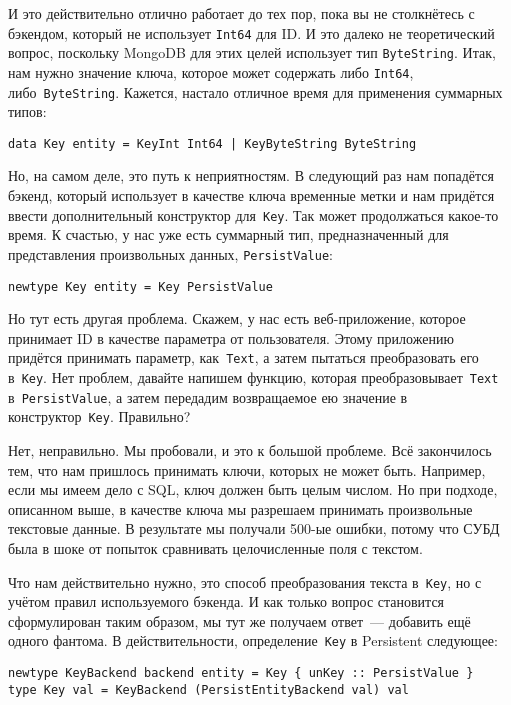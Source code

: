 И это действительно отлично работает до тех пор, пока вы не столкнётесь с
бэкендом, который не использует \lstinline'Int64' для ID. И это далеко не
теоретический вопрос, поскольку MongoDB для этих целей использует тип
\lstinline'ByteString'. Итак, нам нужно значение ключа, которое может содержать
либо \lstinline'Int64', либо~\lstinline'ByteString'. Кажется, настало отличное
время для применения суммарных типов:

\begin{lstlisting}
data Key entity = KeyInt Int64 | KeyByteString ByteString
\end{lstlisting}

Но, на самом деле, это путь к неприятностям. В следующий раз нам попадётся
бэкенд, который использует в качестве ключа временные метки и нам придётся
ввести дополнительный конструктор для~\lstinline'Key'. Так может продолжаться
какое-то время. К счастью, у нас уже есть суммарный тип, предназначенный для
представления произвольных данных, \lstinline'PersistValue':

\begin{lstlisting}
newtype Key entity = Key PersistValue
\end{lstlisting}

Но тут есть другая проблема. Скажем, у нас есть веб-приложение, которое
принимает ID в качестве параметра от пользователя. Этому приложению придётся
принимать параметр, как~\lstinline'Text', а затем пытаться преобразовать его
в~\lstinline'Key'. Нет проблем, давайте напишем функцию, которая
преобразовывает~\lstinline'Text' в~\lstinline'PersistValue', а затем передадим
возвращаемое ею значение в конструктор~\lstinline'Key'. Правильно?

Нет, неправильно. Мы пробовали, и это к большой проблеме. Всё закончилось тем,
что нам пришлось принимать ключи, которых не может быть. Например, если мы
имеем дело с SQL, ключ должен быть целым числом. Но при подходе, описанном
выше, в качестве ключа мы разрешаем принимать произвольные текстовые данные. В
результате мы получали 500-ые ошибки, потому что СУБД была в шоке от попыток
сравнивать целочисленные поля с текстом.

Что нам действительно нужно, это способ преобразования текста
в~\lstinline'Key', но с учётом правил используемого бэкенда. И как только
вопрос становится сформулирован таким образом, мы тут же получаем ответ~---
добавить ещё одного фантома. В действительности, определение~\lstinline'Key' в
Persistent следующее:

\begin{lstlisting}
newtype KeyBackend backend entity = Key { unKey :: PersistValue }
type Key val = KeyBackend (PersistEntityBackend val) val
\end{lstlisting}

